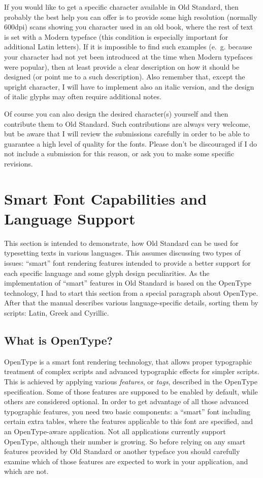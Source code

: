 \documentclass[12pt,a4paper,openany]{book}
\begin{document}
If you would like to get a specific character available in Old Standard,
then probably the best help you can offer is to provide some high
resolution (normally 600dpi) scans showing you character used in an old
book, where the rest of text is set with a Modern typeface (this condition
is especially important for additional Latin letters). If it is impossible
to find such examples (e.~g. because your character had not yet been
introduced at the time when Modern typefaces were popular), then at least 
provide a clear description on how it should be designed (or point me to a
such description). Also remember that, except the upright character, I will
have to implement also an italic version, and the design of italic glyphs
may often require additional notes.

Of course you can also design the desired character(s) yourself and then
contribute them to Old Standard. Such contributions are always very
welcome, but be aware that I will review the submissions carefully in order
to be able to guarantee a high level of quality for the fonts. Please
don’t be discouraged if I do not include a submission for this reason, or
ask you to make some specific revisions.

\section{Smart Font Capabilities and Language Support}

This section is intended to demonstrate, how Old Standard can be used for
typesetting texts in various languages. This assumes discussing two types
of issues: “smart” font rendering features intended to provide a better
support for each specific language and some glyph design peculiarities. As
the implementation of “smart” features in Old Standard is based on the
OpenType technology, I had to start this section from a special paragraph
about OpenType. After that the manual describes various language-specific
details, sorting them by scripts: Latin, Greek and Cyrillic.

\subsection{What is OpenType?}
\hypertarget{OT}{}\label{OT}

OpenType is a smart font rendering technology, that allows proper
typographic treatment of complex scripts and advanced typographic effects
for simpler scripts. This is achieved by applying various
\textit{features}, or \textit{tags}, described in the OpenType
specification. Some of those features are supposed to be enabled by
default, while others are considered optional. In order to get advantage of
all those advanced typographic features, you need two basic components: a
“smart” font including certain extra tables, where the features applicable
to this font are specified, and an OpenType-aware application. Not all
applications currently support OpenType, although their number is growing.
So before relying on any smart features provided by Old Standard or another
typeface you should carefully examine which of those features are expected
to work in your application, and which are not.
\end{document}
